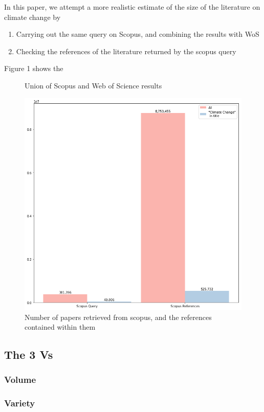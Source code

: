 \documentclass{article}
\begin{document}
In this paper, we attempt a more realistic estimate of the size of the literature on climate change by
\begin{enumerate}
	\item Carrying out the same query on Scopus, and combining the results with WoS
    \item Checking the references of the literature returned by the scopus query
\end{enumerate}

Figure 1 shows the 

\begin{figure}
\caption{Union of Scopus and Web of Science results}
\end{figure}

\begin{figure}
\includegraphics[width=\linewidth]{plots/scopus_docs_refs}
\caption{Number of papers retrieved from scopus, and the references contained within them}
\end{figure}


% 
% 

\subsection{The 3 Vs}
\subsubsection*{Volume}
\subsubsection*{Variety}



\end{document}
